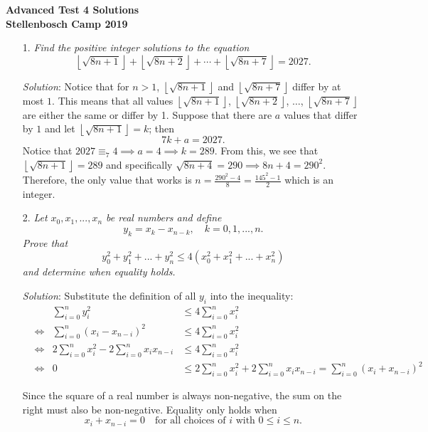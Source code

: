 \documentclass{article}
\begin{document}
\begin{center}
  \textbf{\Large Advanced Test 4 Solutions}
  \\ \vspace{1em}
  \textbf{\large Stellenbosch Camp 2019}
\end{center}

\vspace{12pt}


\begin{enumerate}

\item[1.] %
\newcommand{\floorsqrt}[1]{\left\lfloor\sqrt{#1}\right\rfloor} 
\textit{
Find the positive integer solutions to the equation
\[ \floorsqrt{8n+1} +\floorsqrt{8n+2} +\dotsb +\floorsqrt{8n+7} = 2027. \]}

\textit{Solution}:
Notice that for $n > 1$, $\floorsqrt{8n + 1}$ and $\floorsqrt{8n + 7}$ differ by at most $1$.
This means that all values $\floorsqrt{8n + 1}$, $\floorsqrt{8n + 2}$, $\dots$, $\floorsqrt{8n + 7}$ are either the same or differ by 1.
Suppose that there are $a$ values that differ by $1$ and let $\floorsqrt{8n + 1} = k$; then
\[ 7k + a = 2027. \]
Notice that $2027 \equiv _7 4 \implies a = 4 \implies k = 289$.
From this, we see that $\floorsqrt{8n + 1} = 289$ and specifically $\sqrt{8n + 4} = 290 \implies 8n + 4 = 290^2$.
Therefore, the only value that works is $n = \frac{290^2 - 4}{8} = \frac{145^2 - 1}{2}$ which is an integer.


\item[2.] %
\textit{
Let $x_0, x_1,..., x_n$ be real numbers and define
\[y_k=x_k-x_{n-k}, \quad k=0,1,...,n.\]
Prove that 
\[y_0^2 + y_1^2+...+ y_n^2 \leq 4(x_0^2 + x_1^2 + ... + x_n^2) \]
and determine when equality holds.
}

\textit{Solution}: 
Substitute the definition of all $y_i$ into the inequality:
\begin{align*}
  &&\sum_{i=0}^{n}y_i^2 &\leq 4\sum_{i=0}^{n}x_i^2 \\
  &\iff& \sum_{i=0}^{n}(x_i - x_{n-i})^2 &\leq 4\sum_{i=0}^{n}x_i^2 \\
  &\iff& 2\sum_{i=0}^{n}x_i^2 - 2\sum_{i=0}^{n}x_ix_{n-i} &\leq 4\sum_{i=0}^{n}x_i^2 \\
  &\iff& 0 &\leq 2\sum_{i=0}^{n}x_i^2 + 2\sum_{i=0}^{n}x_ix_{n-i} = \sum_{i=0}^{n}(x_i + x_{n-i})^2
\end{align*}

Since the square of a real number is always non-negative, the sum on the right must also be non-negative.
Equality only holds when
\[ x_i + x_{n-i} = 0 \quad \text{for all choices of } i \text{ with } 0 \leq i \leq n. \]



\end{enumerate}
\end{document}

